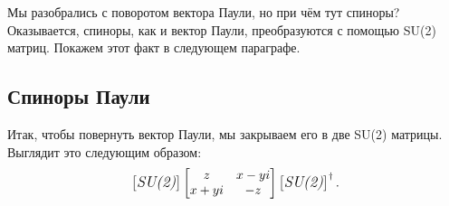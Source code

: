 Мы разобрались с поворотом вектора Паули, но при чём тут спиноры? Оказывается,
спиноры, как и вектор Паули, преобразуются с помощью SU(2) матриц. Покажем этот
факт в следующем параграфе.

\subsection{Спиноры Паули}
Итак, чтобы повернуть вектор Паули, мы закрываем его в две SU(2) матрицы.
Выглядит это следующим образом:
\[
  \begin{bmatrix} \textit{\large{SU(2)}} \end{bmatrix} \begin{bmatrix} z & x-yi\\ x + yi & -z \end{bmatrix} \begin{bmatrix} \textit{\large{SU(2)}} \end{bmatrix}^{\dagger}.
\]

